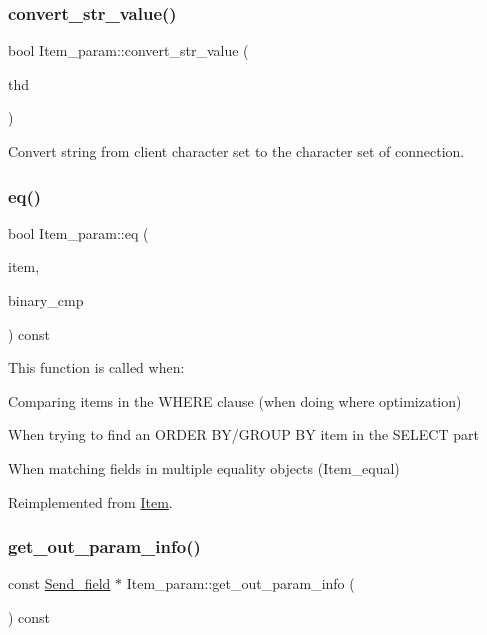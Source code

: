 \subsubsection{\texorpdfstring{convert\+\_\+str\+\_\+value()}{convert\_str\_value()}}
{\footnotesize\ttfamily bool Item\+\_\+param\+::convert\+\_\+str\+\_\+value (\begin{DoxyParamCaption}\item[{T\+HD $\ast$}]{thd }\end{DoxyParamCaption})}

Convert string from client character set to the character set of connection. \mbox{\label{classItem__param_ab816b03dcf1fc98c4f7990d7b22b1b16}} 
\subsubsection{\texorpdfstring{eq()}{eq()}}
{\footnotesize\ttfamily bool Item\+\_\+param\+::eq (\begin{DoxyParamCaption}\item[{const \mbox{\hyperlink{classItem}{Item}} $\ast$}]{item,  }\item[{bool}]{binary\+\_\+cmp }\end{DoxyParamCaption}) const\hspace{0.3cm}{\ttfamily [virtual]}}

This function is called when\+:
\begin{DoxyItemize}
\item Comparing items in the W\+H\+E\+RE clause (when doing where optimization)
\item When trying to find an O\+R\+D\+ER B\+Y/\+G\+R\+O\+UP BY item in the S\+E\+L\+E\+CT part
\item When matching fields in multiple equality objects (Item\+\_\+equal) 
\end{DoxyItemize}

Reimplemented from \mbox{\hyperlink{classItem_af0957bbdb9a256de0cd29f1adcae28be}{Item}}.

\mbox{\label{classItem__param_a7368f7c6849b044c7df3c55069e5ba8d}} 
\subsubsection{\texorpdfstring{get\+\_\+out\+\_\+param\+\_\+info()}{get\_out\_param\_info()}}
{\footnotesize\ttfamily const \mbox{\hyperlink{classSend__field}{Send\+\_\+field}} $\ast$ Item\+\_\+param\+::get\+\_\+out\+\_\+param\+\_\+info (\begin{DoxyParamCaption}{ }\end{DoxyParamCaption}) const\hspace{0.3cm}{\ttfamily [virtual]}}

